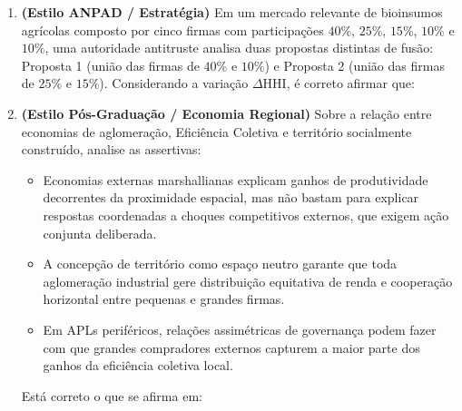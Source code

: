 \begin{enumerate}[leftmargin=1.6em, itemsep=8pt]
  \item \textbf{(Estilo ANPAD / Estratégia)} Em um mercado relevante de bioinsumos agrícolas composto por cinco firmas com participações $40\%$, $25\%$, $15\%$, $10\%$ e $10\%$, uma autoridade antitruste analisa duas propostas distintas de fusão: Proposta 1 (união das firmas de $40\%$ e $10\%$) e Proposta 2 (união das firmas de $25\%$ e $15\%$). Considerando a variação $\Delta \text{HHI}$, é correto afirmar que:

  \item \textbf{(Estilo Pós-Graduação / Economia Regional)} Sobre a relação entre economias de aglomeração, Eficiência Coletiva e território socialmente construído, analise as assertivas:
  \begin{itemize}[leftmargin=1.2em, itemsep=2pt]
    \item[I.] Economias externas marshallianas explicam ganhos de produtividade decorrentes da proximidade espacial, mas não bastam para explicar respostas coordenadas a choques competitivos externos, que exigem ação conjunta deliberada.
    \item[II.] A concepção de território como espaço neutro garante que toda aglomeração industrial gere distribuição equitativa de renda e cooperação horizontal entre pequenas e grandes firmas.
    \item[III.] Em APLs periféricos, relações assimétricas de governança podem fazer com que grandes compradores externos capturem a maior parte dos ganhos da eficiência coletiva local.
  \end{itemize}
  Está correto o que se afirma em:


\end{enumerate}
